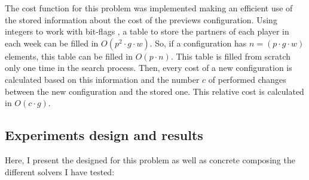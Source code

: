 

The cost function for this problem was implemented making an efficient use of the stored information about the cost of the previews configuration. Using integers to work with bit-flags , a table to store the partners of each player in each week can be filled in $O\left(p^2\cdot g \cdot w\right)$. So, if a configuration has $n = (p\cdot g \cdot w)$ elements, this table can be filled in $O\left(p\cdot n\right)$. This table is filled from scratch only one time in the search process. Then, every cost of a new configuration is calculated based on this information and the number $c$ of performed changes between the new configuration and the stored one. This relative cost is calculated in $O\left(c\cdot g\right)$.

\subsection{Experiments design and results}

Here, I present the \as{} designed for this problem as well as concrete \oms{} composing the different solvers I have tested:

